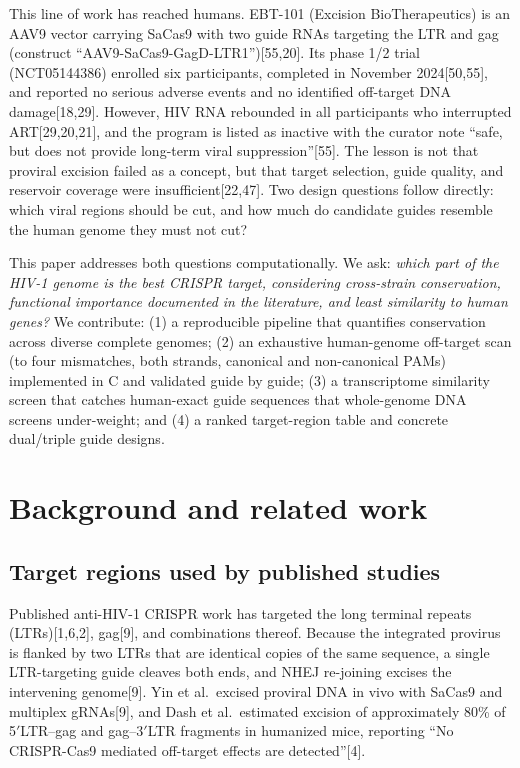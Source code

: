 \documentclass[11pt]{article}
\newcommand{\src}[1]{[#1]}
\newcommand{\HH}{HIV-1}
\begin{document}
This line of work has reached humans. EBT-101 (Excision BioTherapeutics) is
an AAV9 vector carrying SaCas9 with two guide RNAs targeting the LTR and
gag (construct ``AAV9-SaCas9-GagD-LTR1'')\src{55,20}. Its phase 1/2 trial
(NCT05144386) enrolled six participants, completed in November
2024\src{50,55}, and reported no serious adverse events and no identified
off-target DNA damage\src{18,29}. However, HIV RNA rebounded in all
participants who interrupted ART\src{29,20,21}, and the program is listed as
inactive with the curator note ``safe, but does not provide long-term viral
suppression''\src{55}. The lesson is not that proviral excision failed as a
concept, but that target selection, guide quality, and reservoir coverage
were insufficient\src{22,47}. Two design questions follow directly: which
viral regions should be cut, and how much do candidate guides resemble the
human genome they must not cut?

This paper addresses both questions computationally. We ask: \emph{which
part of the \HH{} genome is the best CRISPR target, considering cross-strain
conservation, functional importance documented in the literature, and least
similarity to human genes?} We contribute: (1) a reproducible pipeline that
quantifies conservation across \nstrains{} diverse complete genomes; (2) an
exhaustive human-genome off-target scan (to four mismatches, both strands,
canonical and non-canonical PAMs) implemented in C and validated guide by
guide; (3) a transcriptome similarity screen that catches human-exact guide
sequences that whole-genome DNA screens under-weight; and (4) a ranked
target-region table and concrete dual/triple guide designs.

\section{Background and related work}

\subsection{Target regions used by published studies}
Published anti-\HH{} CRISPR work has targeted the long terminal repeats
(LTRs)\src{1,6,2}, gag\src{9}, and combinations thereof. Because the
integrated provirus is flanked by two LTRs that are identical copies of the
same sequence, a single LTR-targeting guide cleaves both ends, and NHEJ
re-joining excises the intervening genome\src{9}. Yin et al.\ excised
proviral DNA in vivo with SaCas9 and multiplex gRNAs\src{9}, and Dash et
al.\ estimated excision of approximately 80\% of 5$'$LTR--gag and gag--3$'$LTR
fragments in humanized mice, reporting ``No CRISPR-Cas9 mediated off-target
effects are detected''\src{4}.
\end{document}
